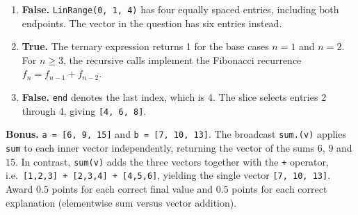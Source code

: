 \documentclass[a4paper]{article}
\newcommand{\julia}[1]{\texttt{#1}}
\begin{document}
\begin{enumerate}[itemsep=8pt]
    \item \textbf{False.} \julia{LinRange(0, 1, 4)} has four equally spaced
        entries, including both endpoints.
        The vector in the question has six entries instead.

    \item \textbf{True.} The ternary expression returns 1 for the base cases
        $n=1$ and $n=2$. For $n\geq3$, the recursive calls implement
        the Fibonacci recurrence $f_n=f_{n-1}+f_{n-2}$.

    \item \textbf{False.} \julia{end} denotes the last index, which is 4.
        The slice selects entries 2 through 4, giving \julia{[4, 6, 8]}.
\end{enumerate}

\noindent\textbf{Bonus.}
\julia{a = [6, 9, 15]} and \julia{b = [7, 10, 13]}.
The broadcast \julia{sum.(v)} applies \julia{sum} to each inner vector
independently, returning the vector of the sums $6$, $9$ and $15$.
In contrast, \julia{sum(v)} adds the three vectors together with the
\julia{+} operator, i.e.\ \julia{[1,2,3] + [2,3,4] + [4,5,6]},
yielding the single vector \julia{[7, 10, 13]}.
Award 0.5 points for each correct final value and 0.5 points for each
correct explanation (elementwise sum versus vector addition).
\fi
\end{document}

